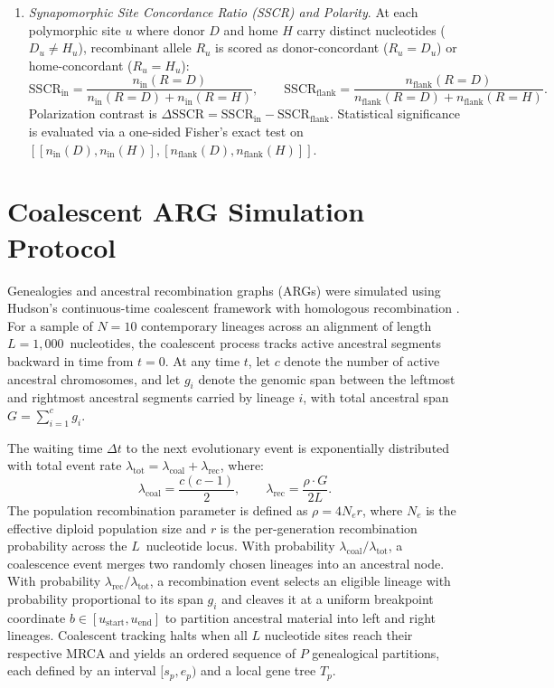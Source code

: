 \begin{enumerate}
    \item \emph{Synapomorphic Site Concordance Ratio (SSCR) and Polarity}. At each polymorphic site $u$ where donor $D$ and home $H$ carry distinct nucleotides ($D_u \ne H_u$), recombinant allele $R_u$ is scored as donor-concordant ($R_u = D_u$) or home-concordant ($R_u = H_u$):
    \begin{equation}
    \mathrm{SSCR}_{\mathrm{in}} = \frac{n_{\mathrm{in}}(R = D)}{n_{\mathrm{in}}(R = D) + n_{\mathrm{in}}(R = H)}, \qquad \mathrm{SSCR}_{\mathrm{flank}} = \frac{n_{\mathrm{flank}}(R = D)}{n_{\mathrm{flank}}(R = D) + n_{\mathrm{flank}}(R = H)}.
    \end{equation}
    Polarization contrast is $\Delta\mathrm{SSCR} = \mathrm{SSCR}_{\mathrm{in}} - \mathrm{SSCR}_{\mathrm{flank}}$. Statistical significance is evaluated via a one-sided Fisher's exact test on $[[n_{\mathrm{in}}(D), n_{\mathrm{in}}(H)], [n_{\mathrm{flank}}(D), n_{\mathrm{flank}}(H)]]$.
\end{enumerate}

\section{Coalescent ARG Simulation Protocol}
\label{supp:coalescent_sim_full}

Genealogies and ancestral recombination graphs (ARGs) were simulated using Hudson's continuous-time coalescent framework with homologous recombination \citep{hudson1983properties,posada2001evaluation}.
For a sample of $N = 10$ contemporary lineages across an alignment of length $L = 1{,}000$~nucleotides, the coalescent process tracks active ancestral segments backward in time from $t = 0$.
At any time $t$, let $c$ denote the number of active ancestral chromosomes, and let $g_i$ denote the genomic span between the leftmost and rightmost ancestral segments carried by lineage $i$, with total ancestral span $G = \sum_{i=1}^c g_i$.

The waiting time $\Delta t$ to the next evolutionary event is exponentially distributed with total event rate $\lambda_{\mathrm{tot}} = \lambda_{\mathrm{coal}} + \lambda_{\mathrm{rec}}$, where:
\begin{equation}
\lambda_{\mathrm{coal}} = \frac{c(c - 1)}{2}, \qquad \lambda_{\mathrm{rec}} = \frac{\rho \cdot G}{2L}.
\end{equation}
The population recombination parameter is defined as $\rho = 4 N_e r$, where $N_e$ is the effective diploid population size and $r$ is the per-generation recombination probability across the $L$~nucleotide locus.
With probability $\lambda_{\mathrm{coal}} / \lambda_{\mathrm{tot}}$, a coalescence event merges two randomly chosen lineages into an ancestral node.
With probability $\lambda_{\mathrm{rec}} / \lambda_{\mathrm{tot}}$, a recombination event selects an eligible lineage with probability proportional to its span $g_i$ and cleaves it at a uniform breakpoint coordinate $b \in [u_{\mathrm{start}}, u_{\mathrm{end}}]$ to partition ancestral material into left and right lineages.
Coalescent tracking halts when all $L$ nucleotide sites reach their respective MRCA and yields an ordered sequence of $P$ genealogical partitions, each defined by an interval $[s_p, e_p)$ and a local gene tree $T_p$.

